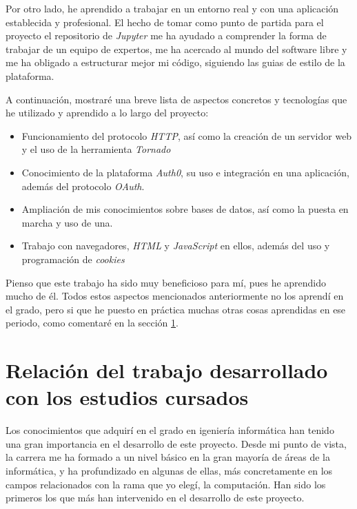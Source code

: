 \documentclass[11pt,spanish,listoffigures,listoftables]{tfgetsinf}
\begin{document}
Por otro lado, he aprendido a trabajar en un entorno real y con una aplicación establecida y profesional. El hecho de tomar como punto de partida para el proyecto el repositorio de \textit{Jupyter} me ha ayudado a comprender la forma de trabajar de un equipo de expertos, me ha acercado al mundo del software libre y me ha obligado a estructurar mejor mi código, siguiendo las guias de estilo de la plataforma.

A continuación, mostraré una breve lista de aspectos concretos y tecnologías que he utilizado y aprendido a lo largo del proyecto:

\begin{itemize}

\item Funcionamiento del protocolo \textit{HTTP}, así como la creación de un servidor web y el uso de la herramienta \textit{Tornado}

\item Conocimiento de la plataforma \textit{Auth0}, su uso e integración en una aplicación, además del protocolo \textit{OAuth}.

\item Ampliación de mis conocimientos sobre bases de datos, así como la puesta en marcha y uso de una.

\item Trabajo con navegadores, \textit{HTML} y \textit{JavaScript} en ellos, además del uso y programación de \textit{cookies} 
\end{itemize}

Pienso que este trabajo ha sido muy beneficioso para mí, pues he aprendido mucho de él. Todos estos aspectos mencionados anteriormente no los aprendí en el grado, pero si que he puesto en práctica muchas otras cosas aprendidas en ese periodo, como comentaré en la sección \ref{sec:estudios-cursados}.


\section{Relación del trabajo desarrollado con los estudios cursados}
\label{sec:estudios-cursados}

Los conocimientos que adquirí en el grado en igeniería informática han tenido una gran importancia en el desarrollo de este proyecto. Desde mi punto de vista, la carrera me ha formado a un nivel básico en la gran mayoría de áreas de la informática, y ha profundizado en algunas de ellas, más concretamente en los campos relacionados con la rama que yo elegí, la computación. Han sido los primeros los que más han intervenido en el desarrollo de este proyecto.
\end{document}
